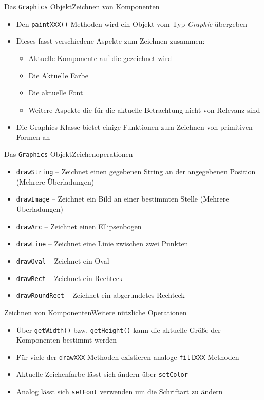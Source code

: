 \begin{frame}{Das \texttt{Graphics} Objekt}{Zeichnen von Komponenten}
    \begin{itemize}
        \item Den \texttt{paintXXX()} Methoden wird ein Objekt vom Typ \textit{Graphic} übergeben
        \item Dieses fasst verschiedene Aspekte zum Zeichnen zusammen:
        \begin{itemize}
            \item Aktuelle Komponente auf die gezeichnet wird
            \item Die Aktuelle Farbe
            \item Die aktuelle Font
            \item Weitere Aspekte die für die aktuelle Betrachtung nicht von Relevanz sind
        \end{itemize}
        \item Die Graphics Klasse bietet einige Funktionen zum Zeichnen von primitiven Formen an
    \end{itemize}
\end{frame}

\begin{frame}{Das \texttt{Graphics} Objekt}{Zeichenoperationen}
    \begin{itemize}
        \item \texttt{drawString} -- Zeichnet einen gegebenen String an der angegebenen Position (Mehrere Überladungen)
        \item \texttt{drawImage} -- Zeichnet ein Bild an einer bestimmten Stelle (Mehrere Überladungen)
        \item \texttt{drawArc} -- Zeichnet einen Ellipsenbogen
        \item \texttt{drawLine} -- Zeichnet eine Linie zwischen zwei Punkten
        \item \texttt{drawOval} -- Zeichnet ein Oval
        \item \texttt{drawRect} -- Zeichnet ein Rechteck
        \item \texttt{drawRoundRect} -- Zeichnet ein abgerundetes Rechteck
    \end{itemize}
\end{frame}

\begin{frame}{Zeichnen von Komponenten}{Weitere nützliche Operationen}
    \begin{itemize}
        \item Über \texttt{getWidth()} bzw. \texttt{getHeight()} kann die aktuelle Größe der Komponenten bestimmt werden
        \item Für viele der \texttt{drawXXX} Methoden existieren analoge \texttt{fillXXX} Methoden
        \item Aktuelle Zeichenfarbe lässt sich ändern über \texttt{setColor}
        \item Analog lässt sich \texttt{setFont} verwenden um die Schriftart zu ändern
    \end{itemize}
\end{frame}

